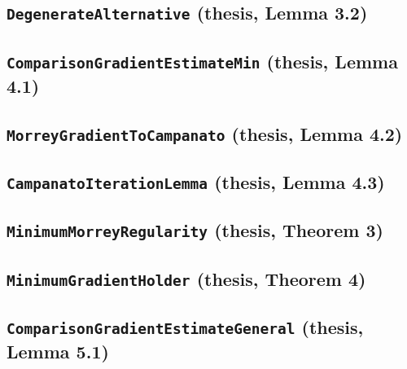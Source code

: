 \documentclass[11pt]{amsart}
\theoremstyle{definition}
\begin{document}
\subsection{\texorpdfstring{\texttt{DegenerateAlternative} (thesis, Lemma 3.2)}{DegenerateAlternative}}\label{node:DegenerateAlternative}


\subsection{\texorpdfstring{\texttt{ComparisonGradientEstimateMin} (thesis, Lemma 4.1)}{ComparisonGradientEstimateMin}}\label{node:ComparisonGradientEstimateMin}


\subsection{\texorpdfstring{\texttt{MorreyGradientToCampanato} (thesis, Lemma 4.2)}{MorreyGradientToCampanato}}\label{node:MorreyGradientToCampanato}


\subsection{\texorpdfstring{\texttt{CampanatoIterationLemma} (thesis, Lemma 4.3)}{CampanatoIterationLemma}}\label{node:CampanatoIterationLemma}


\subsection{\texorpdfstring{\texttt{MinimumMorreyRegularity} (thesis, Theorem 3)}{MinimumMorreyRegularity}}\label{node:MinimumMorreyRegularity}


\subsection{\texorpdfstring{\texttt{MinimumGradientHolder} (thesis, Theorem 4)}{MinimumGradientHolder}}\label{node:MinimumGradientHolder}


\subsection{\texorpdfstring{\texttt{ComparisonGradientEstimateGeneral} (thesis, Lemma 5.1)}{ComparisonGradientEstimateGeneral}}\label{node:ComparisonGradientEstimateGeneral}

\end{document}
